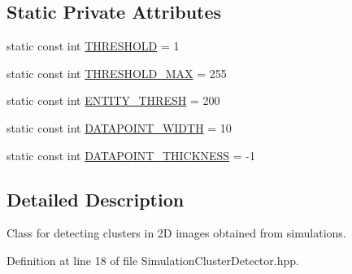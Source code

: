 \subsection*{\-Static \-Private \-Attributes}
\begin{DoxyCompactItemize}
\item 
static const int \hyperlink{classmultiscale_1_1analysis_1_1SimulationClusterDetector_a460525b4359afb52b4bde2ebd600122c}{\-T\-H\-R\-E\-S\-H\-O\-L\-D} = 1
\item 
static const int \hyperlink{classmultiscale_1_1analysis_1_1SimulationClusterDetector_a32b52c0ce7f8a1c8da872aa1cf754317}{\-T\-H\-R\-E\-S\-H\-O\-L\-D\-\_\-\-M\-A\-X} = 255
\item 
static const int \hyperlink{classmultiscale_1_1analysis_1_1SimulationClusterDetector_ad161524f0da7d2414e616fff59f02118}{\-E\-N\-T\-I\-T\-Y\-\_\-\-T\-H\-R\-E\-S\-H} = 200
\item 
static const int \hyperlink{classmultiscale_1_1analysis_1_1SimulationClusterDetector_a16d99d22863feed83960e6b9efe407a2}{\-D\-A\-T\-A\-P\-O\-I\-N\-T\-\_\-\-W\-I\-D\-T\-H} = 10
\item 
static const int \hyperlink{classmultiscale_1_1analysis_1_1SimulationClusterDetector_a530922a3fad1e612062d17d07e2dc763}{\-D\-A\-T\-A\-P\-O\-I\-N\-T\-\_\-\-T\-H\-I\-C\-K\-N\-E\-S\-S} = -\/1
\end{DoxyCompactItemize}


\subsection{\-Detailed \-Description}
\-Class for detecting clusters in 2\-D images obtained from simulations. 

\-Definition at line 18 of file \-Simulation\-Cluster\-Detector.\-hpp.



